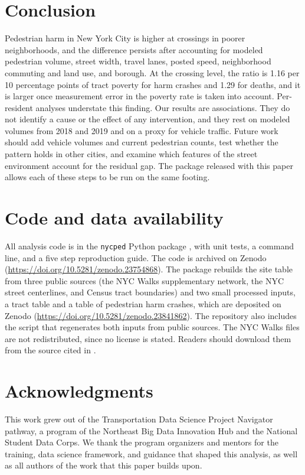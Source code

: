 \documentclass[10pt,twocolumn]{article}
\begin{document}
\section{Conclusion}
Pedestrian harm in New York City is higher at crossings in poorer neighborhoods, and the difference persists after accounting for modeled pedestrian volume, street width, travel lanes, posted speed, neighborhood commuting and land use, and borough. At the crossing level, the ratio is 1.16 per 10 percentage points of tract poverty for harm crashes and 1.29 for deaths, and it is larger once measurement error in the poverty rate is taken into account. Per-resident analyses understate this finding. Our results are associations. They do not identify a cause or the effect of any intervention, and they rest on modeled volumes from 2018 and 2019 and on a proxy for vehicle traffic. Future work should add vehicle volumes and current pedestrian counts, test whether the pattern holds in other cities, and examine which features of the street environment account for the residual gap. The package released with this paper allows each of these steps to be run on the same footing.

\section*{Code and data availability}
All analysis code is in the \texttt{nycped} Python package \citep{nycped_code}, with unit tests, a command line, and a five step reproduction guide. The code is archived on Zenodo (\url{https://doi.org/10.5281/zenodo.23754868}). The package rebuilds the site table from three public sources (the NYC Walks supplementary network, the NYC street centerlines, and Census tract boundaries) and two small processed inputs, a tract table and a table of pedestrian harm crashes, which are deposited on Zenodo (\url{https://doi.org/10.5281/zenodo.23841862}). The repository also includes the script that regenerates both inputs from public sources. The NYC Walks files are not redistributed, since no license is stated. Readers should download them from the source cited in \citet{sevtsuk2026nycwalks}.

\section*{Acknowledgments}
This work grew out of the Transportation Data Science Project Navigator pathway, a program of the Northeast Big Data Innovation Hub and the National Student Data Corps. We thank the program organizers and mentors for the training, data science framework, and guidance that shaped this analysis, as well as all authors of the work that this paper builds upon.
\end{document}
